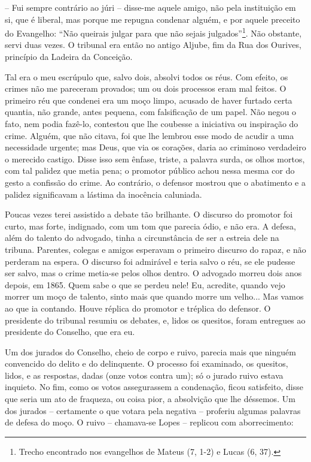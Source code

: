 -- Fui sempre contrário ao júri -- disse-me aquele amigo, não pela
instituição em si, que é liberal, mas porque me repugna condenar alguém,
e por aquele preceito do Evangelho: ``Não queirais julgar para que não
sejais julgados''\footnote{Trecho encontrado nos evangelhos de Mateus
  (7, 1-2) e Lucas (6, 37).}. Não obstante, servi duas vezes. O tribunal
era então no antigo Aljube, fim da Rua dos Ourives, princípio da Ladeira
da Conceição.

Tal era o meu escrúpulo que, salvo dois, absolvi todos os réus. Com
efeito, os crimes não me pareceram provados; um ou dois processos eram
mal feitos. O primeiro réu que condenei era um moço limpo, acusado de
haver furtado certa quantia, não grande, antes pequena, com falsificação
de um papel. Não negou o fato, nem podia fazê-lo, contestou que lhe
coubesse a iniciativa ou inspiração do crime. Alguém, que não citava,
foi que lhe lembrou esse modo de acudir a uma necessidade urgente; mas
Deus, que via os corações, daria ao criminoso verdadeiro o merecido
castigo. Disse isso sem ênfase, triste, a palavra surda, os olhos
mortos, com tal palidez que metia pena; o promotor público achou nessa
mesma cor do gesto a confissão do crime. Ao contrário, o defensor
mostrou que o abatimento e a palidez significavam a lástima da inocência
caluniada.

Poucas vezes terei assistido a debate tão brilhante. O discurso do
promotor foi curto, mas forte, indignado, com um tom que parecia ódio, e
não era. A defesa, além do talento do advogado, tinha a circunstância de
ser a estreia dele na tribuna. Parentes, colegas e amigos esperavam o
primeiro discurso do rapaz, e não perderam na espera. O discurso foi
admirável e teria salvo o réu, se ele pudesse ser salvo, mas o crime
metia-se pelos olhos dentro. O advogado morreu dois anos depois, em
1865. Quem sabe o que se perdeu nele! Eu, acredite, quando vejo morrer
um moço de talento, sinto mais que quando morre um velho... Mas vamos ao
que ia contando. Houve réplica do promotor e tréplica do defensor. O
presidente do tribunal resumiu os debates, e, lidos os quesitos, foram
entregues ao presidente do Conselho, que era eu.

Um dos jurados do Conselho, cheio de corpo e ruivo, parecia mais que
ninguém convencido do delito e do delinquente. O processo foi examinado,
os quesitos, lidos, e as respostas, dadas (onze votos contra um); só o
jurado ruivo estava inquieto. No fim, como os votos assegurassem a
condenação, ficou satisfeito, disse que seria um ato de fraqueza, ou
coisa pior, a absolvição que lhe déssemos. Um dos jurados -- certamente
o que votara pela negativa -- proferiu algumas palavras de defesa do
moço. O ruivo -- chamava-se Lopes -- replicou com aborrecimento:

